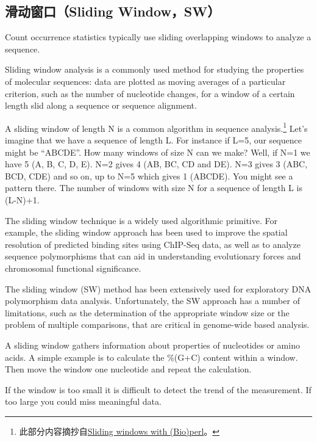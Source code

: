 \documentclass[11pt,a4paper,twoside]{book}
\begin{document}
\subsection{滑动窗口（Sliding Window，SW）}
Count occurrence statistics typically use sliding overlapping windows to analyze a sequence.

Sliding window analysis is a commonly used method for studying the properties of molecular sequences: data are plotted as moving averages of a particular criterion, such as the number of nucleotide changes, for a window of a certain length slid along a sequence or sequence alignment.

A sliding window of length N is a common algorithm in sequence analysis.\footnote{此部分内容摘抄自\href{https://nsaunders.wordpress.com/2006/10/11/sliding-windows-with-bioperl/}{Sliding windows with (Bio)perl}。} Let’s imagine that we have a sequence of length L. For instance if L=5, our sequence might be “ABCDE”. How many windows of size N can we make? Well, if N=1 we have 5 (A, B, C, D, E). N=2 gives 4 (AB, BC, CD and DE). N=3 gives 3 (ABC, BCD, CDE) and so on, up to N=5 which gives 1 (ABCDE). You might see a pattern there. The number of windows with size N for a sequence of length L is (L-N)+1.

The sliding window technique is a widely used algorithmic primitive. For example, the sliding window approach has been used to improve the spatial resolution of predicted binding sites using ChIP-Seq data, as well as to analyze sequence polymorphisms that can aid in understanding evolutionary forces and chromosomal functional significance.

The sliding window (SW) method has been extensively used for exploratory DNA polymorphism data analysis. Unfortunately, the SW approach has a number of limitations, such as the determination of the appropriate window size or the problem of multiple comparisons, that are critical in genome-wide based analysis.

A sliding window gathers information about properties of nucleotides or amino acids. A simple example is to calculate the \%(G+C) content within a window.  Then move the window one nucleotide and repeat the calculation.

If the window is too small it is difficult to detect the trend of the measurement. If too large you could miss meaningful data.

\noindent
{}
\end{document}
